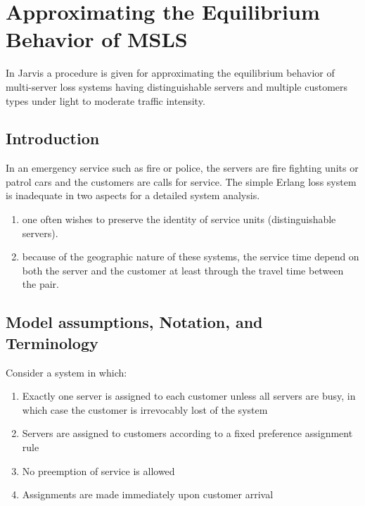 
\section{Approximating the Equilibrium Behavior of MSLS}
\begin{frame}
  In Jarvis \cite{jarvis1985approximating} a procedure is given for approximating the equilibrium behavior of 
  multi-server loss systems having distinguishable servers
  and multiple customers types under light to moderate traffic intensity.
\end{frame}

\subsection{Introduction}
\begin{frame}
  In an emergency service such as fire or police, 
  the servers are fire fighting units or patrol cars
  and the customers are calls for service.
  The simple Erlang loss system  is inadequate in two aspects for a detailed system analysis.
  \begin{enumerate}
  \item one often wishes to preserve the identity of service units (distinguishable servers).
  \item because of the geographic nature of these systems,
    the service time depend on both the server and the customer at least through the travel time between the pair.
  \end{enumerate}
\end{frame}

\subsection{Model assumptions, Notation, and Terminology}
\begin{frame}
  Consider a system in which:
  \begin{enumerate}
  \item Exactly one server is assigned to each customer unless all servers are busy, 
    in which case the customer is irrevocably lost of the system
  \item Servers are assigned to customers according to a fixed preference assignment rule
  \item No preemption of service is allowed
  \item Assignments are made immediately upon customer arrival
  \end{enumerate}
\end{frame}


